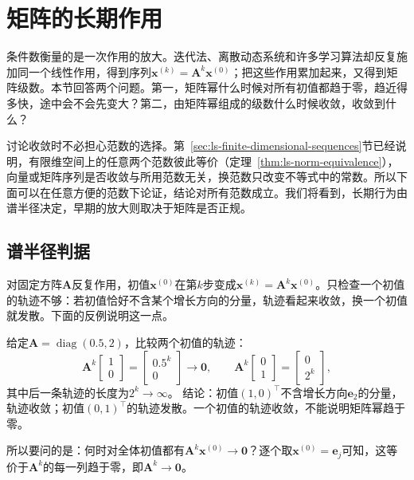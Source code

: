 
\section{矩阵的长期作用}
\label{sec:ls-convergence}
\label{sec:linear-algebra-convergence-approximation}
\label{sec:ls-matrix-power-behavior}
\label{sec:linear-algebra-power-convergence}

条件数衡量的是一次作用的放大。迭代法、离散动态系统和许多学习算法却反复施加同一个线性作用，得到序列$\bm x^{(k)}=\bm A^k\bm x^{(0)}$；把这些作用累加起来，又得到矩阵级数。本节回答两个问题。第一，矩阵幂什么时候对所有初值都趋于零，趋近得多快，途中会不会先变大？第二，由矩阵幂组成的级数什么时候收敛，收敛到什么？

讨论收敛时不必担心范数的选择。第~\ref{sec:ls-finite-dimensional-sequences}节已经说明，有限维空间上的任意两个范数彼此等价（定理~\ref{thm:ls-norm-equivalence}），向量或矩阵序列是否收敛与所用范数无关，换范数只改变不等式中的常数。所以下面可以在任意方便的范数下论证，结论对所有范数成立。我们将看到，长期行为由谱半径决定，早期的放大则取决于矩阵是否正规。

\subsection{谱半径判据}

对固定方阵$\bm A$反复作用，初值$\bm x^{(0)}$在第$k$步变成$\bm x^{(k)}=\bm A^k\bm x^{(0)}$。只检查一个初值的轨迹不够：若初值恰好不含某个增长方向的分量，轨迹看起来收敛，换一个初值就发散。下面的反例说明这一点。
\begin{example}[反例：收敛与发散的轨迹]
\label{ex:ls-partial-convergence}
给定$\bm A=\operatorname{diag}(0.5,2)$，比较两个初值的轨迹：
\[
 \bm A^k\begin{bmatrix}1\\0\end{bmatrix}=\begin{bmatrix}0.5^k\\0\end{bmatrix}\to\bm0,\qquad
 \bm A^k\begin{bmatrix}0\\1\end{bmatrix}=\begin{bmatrix}0\\2^k\end{bmatrix},
\]
其中后一条轨迹的长度为$2^k\to\infty$。
结论：初值$(1,0)^\top$不含增长方向$\bm e_2$的分量，轨迹收敛；初值$(0,1)^\top$的轨迹发散。一个初值的轨迹收敛，不能说明矩阵幂趋于零。
\end{example}
所以要问的是：何时对全体初值都有$\bm A^k\bm x^{(0)}\to\bm0$？逐个取$\bm x^{(0)}=\bm e_j$可知，这等价于$\bm A^k$的每一列趋于零，即$\bm A^k\to\bm0$。

